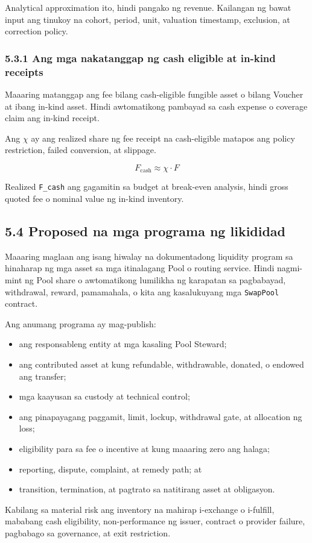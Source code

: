 \documentclass[11pt]{article}
\begin{document}
Analytical approximation ito, hindi pangako ng revenue. Kailangan ng bawat input ang tinukoy na cohort, period, unit, valuation timestamp, exclusion, at correction policy.

\subsubsection*{5.3.1 Ang mga nakatanggap ng cash eligible at in-kind receipts}

Maaaring matanggap ang fee bilang cash-eligible fungible asset o bilang Voucher at ibang in-kind asset. Hindi awtomatikong pambayad sa cash expense o coverage claim ang in-kind receipt.

Ang \texttt{$\chi$} ay ang realized share ng fee receipt na cash-eligible matapos ang policy restriction, failed conversion, at slippage.

\[
F_{\mathrm{cash}} \approx \chi \cdot F
\]

Realized \texttt{F\_cash} ang gagamitin sa budget at break-even analysis, hindi gross quoted fee o nominal value ng in-kind inventory.

\subsection*{5.4 Proposed na mga programa ng likididad}

Maaaring maglaan ang isang hiwalay na dokumentadong liquidity program sa hinaharap ng mga asset sa mga itinalagang Pool o routing service. Hindi nagmi-mint ng Pool share o awtomatikong lumilikha ng karapatan sa pagbabayad, withdrawal, reward, pamamahala, o kita ang kasalukuyang mga \texttt{SwapPool} contract.

Ang anumang programa ay mag-publish:

\begin{itemize}[leftmargin=*]
\item ang responsableng entity at mga kasaling Pool Steward;
\item ang contributed asset at kung refundable, withdrawable, donated, o endowed ang transfer;
\item mga kaayusan sa custody at technical control;
\item ang pinapayagang paggamit, limit, lockup, withdrawal gate, at allocation ng loss;
\item eligibility para sa fee o incentive at kung maaaring zero ang halaga;
\item reporting, dispute, complaint, at remedy path; at
\item transition, termination, at pagtrato sa natitirang asset at obligasyon.
\end{itemize}
Kabilang sa material risk ang inventory na mahirap i-exchange o i-fulfill, mababang cash eligibility, non-performance ng issuer, contract o provider failure, pagbabago sa governance, at exit restriction.
\end{document}
